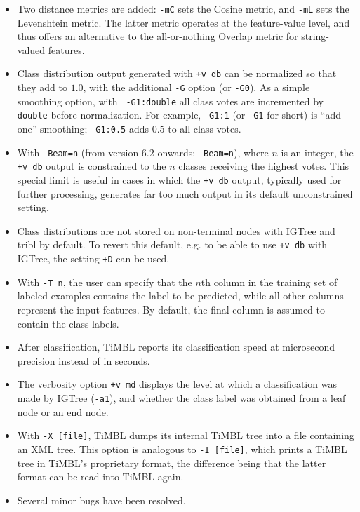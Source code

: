 \documentclass{book}
\begin{document}
\begin{itemize}

\item Two distance metrics are added: {\tt -mC} sets the Cosine
  metric, and {\tt -mL} sets the Levenshtein metric. The latter metric
  operates at the feature-value level, and thus offers an alternative
  to the all-or-nothing Overlap metric for string-valued features. 

\item Class distribution output generated with {\tt +v db} can be
  normalized so that they add to $1.0$, with the additional {\tt -G}
  option (or {\tt -G0}). As a simple smoothing option, with {\tt
    -G1:double} all class votes are incremented by {\tt double} before
  normalization.  For example, {\tt -G1:1} (or {\tt -G1} for short) is
  ``add one''-smoothing; {\tt -G1:0.5} adds $0.5$ to all class votes.

\item With {\tt -Beam=n} (from version 6.2 onwards: {\tt --Beam=n}),
  where $n$ is an integer, the {\tt +v db} output is constrained to
  the $n$ classes receiving the highest votes. This special limit is
  useful in cases in which the {\tt +v db} output, typically used for
  further processing, generates far too much output in its default
  unconstrained setting.

\item Class distributions are not stored on non-terminal nodes with
  {\sc IGTree} and {\sc tribl} by default. To revert this default,
  e.g. to be able to use {\tt +v db} with {\sc IGTree}, the setting
  {\tt +D} can be used.

\item With {\tt -T n}, the user can specify that the $n$th column in
 the training set of labeled examples contains the label to be
 predicted, while all other columns represent the input features. By
 default, the final column is assumed to contain the class labels.

\item After classification, TiMBL reports its classification speed at
  microsecond precision instead of in seconds.

\item The verbosity option {\tt +v md} displays the level at which a
  classification was made by {\sc IGTree} ({\tt -a1}), and whether the
  class label was obtained from a leaf node or an end node.

\item With {\tt -X [file]}, TiMBL dumps its internal TiMBL tree into a
  file containing an XML tree. This option is analogous to {\tt -I
    [file]}, which prints a TiMBL tree in TiMBL's proprietary format,
  the difference being that the latter format can be read into TiMBL
  again.

\item Several minor bugs have been resolved.

\end{itemize}
\end{document}
